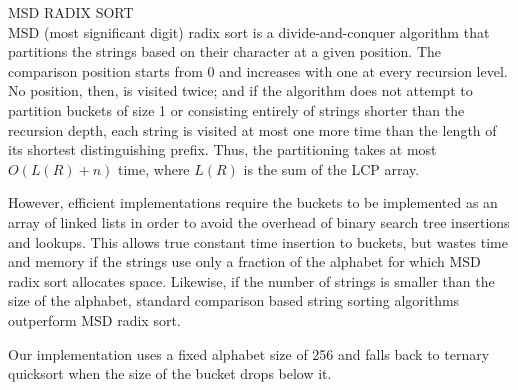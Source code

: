 {\sffamily\normalsize{\color{sciorange} MSD RADIX SORT}}\vspace{1mm}\\
\footnotesize 
MSD (most significant digit) radix sort is a divide-and-conquer algorithm that
partitions the strings based on their character at a given position.  The
comparison position starts from 0 and increases with one at every recursion
level.  No position, then, is visited twice; and if the algorithm does not
attempt to partition buckets of size 1 or consisting entirely of strings
shorter than the recursion depth, each string is visited at most one more time
than the length of its shortest distinguishing prefix.  Thus, the partitioning
takes at most $O(L(R)+n)$ time, where $L(R)$ is the sum of the LCP array.

However, efficient implementations require the buckets to be implemented as an
array of linked lists in order to avoid the overhead of binary search tree
insertions and lookups.  This allows true constant time insertion to buckets,
but wastes time and memory if the strings use only a fraction of the alphabet
for which MSD radix sort allocates space.  Likewise, if the number of strings
is smaller than the size of the alphabet, standard comparison based string
sorting algorithms outperform MSD radix sort.

Our implementation uses a fixed alphabet size of 256 and falls back to ternary
quicksort when the size of the bucket drops below it.
